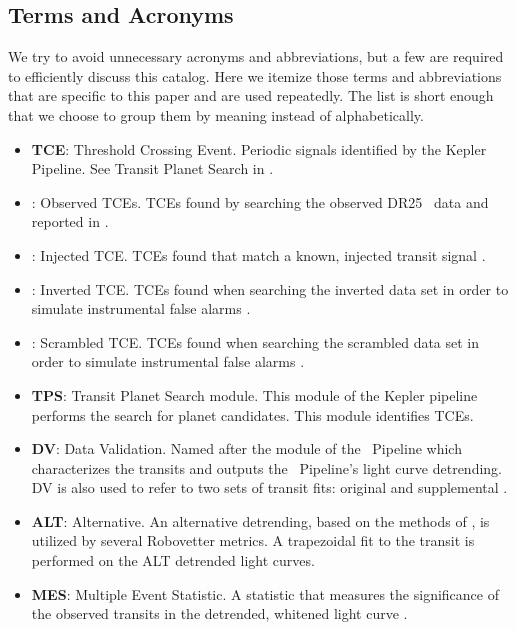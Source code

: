 \subsection{Terms and Acronyms}
\label{abbrev}
We try to avoid unnecessary acronyms and abbreviations, but a few are required to efficiently discuss this catalog.  Here we itemize those terms and abbreviations that are specific to this paper and are used repeatedly. The list is short enough that we choose to group them by meaning instead of alphabetically. 

\begin{itemize}

\item[] \textbf{TCE}: Threshold Crossing Event. Periodic signals identified by the Kepler Pipeline. See Transit Planet Search in \citet{JenkinsKDPH}.
\item[] \textbf{\opstce}: Observed TCEs. TCEs found by searching the observed DR25 \Kepler\ data and reported in \citet{Twicken2016}.
\item[] \textbf{\injtce}: Injected TCE. TCEs found that match a known, injected transit signal \citep{Christiansen2017}.
\item[] \textbf{\invtce}: Inverted TCE. TCEs found when searching the inverted data set in order to simulate instrumental false alarms \citep{Coughlin2017a}.
\item[] \textbf{\scrtce}: Scrambled TCE. TCEs found when searching the scrambled data set in order to simulate instrumental false alarms \citep{Coughlin2017a}.
\item[] \textbf{TPS}: Transit Planet Search module. This module of the Kepler pipeline performs the search for planet candidates. This module identifies TCEs.
\item[] \textbf{DV}: Data Validation. Named after the module of the \Kepler\ Pipeline which characterizes the transits and outputs the \Kepler\ Pipeline's light curve detrending. DV is also used to refer to two sets of transit fits: original and supplemental \citet{JenkinsKDPH}.
\item[] \textbf{ALT}: Alternative. An alternative detrending, based on the methods of \citet{Garcia2010}, is utilized by several Robovetter metrics. A trapezoidal fit to the transit is performed on the ALT detrended light curves.
\item[] \textbf{MES}: Multiple Event Statistic. A statistic that measures the significance of the observed transits in the detrended, whitened light curve \citep{Jenkins2002a}.

\end{itemize}
